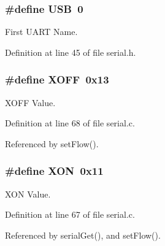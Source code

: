 \hypertarget{group__uart_ga779bf099075a999d1074357fccbd466b}{
\subsubsection[{U\-S\-B}]{\setlength{\rightskip}{0pt plus 5cm}\#define U\-S\-B~0}}\label{group__uart_ga779bf099075a999d1074357fccbd466b}


First U\-A\-R\-T Name. 



Definition at line 45 of file serial.\-h.

\hypertarget{group__uart_ga67fd78ae15d2b67c10d44d69a49ab1c5}{
\subsubsection[{X\-O\-F\-F}]{\setlength{\rightskip}{0pt plus 5cm}\#define X\-O\-F\-F~0x13}}\label{group__uart_ga67fd78ae15d2b67c10d44d69a49ab1c5}


X\-O\-F\-F Value. 



Definition at line 68 of file serial.\-c.



Referenced by set\-Flow().

\hypertarget{group__uart_gacdf721774c51e08c6609e6fa8cf82cc9}{
\subsubsection[{X\-O\-N}]{\setlength{\rightskip}{0pt plus 5cm}\#define X\-O\-N~0x11}}\label{group__uart_gacdf721774c51e08c6609e6fa8cf82cc9}


X\-O\-N Value. 



Definition at line 67 of file serial.\-c.



Referenced by serial\-Get(), and set\-Flow().



